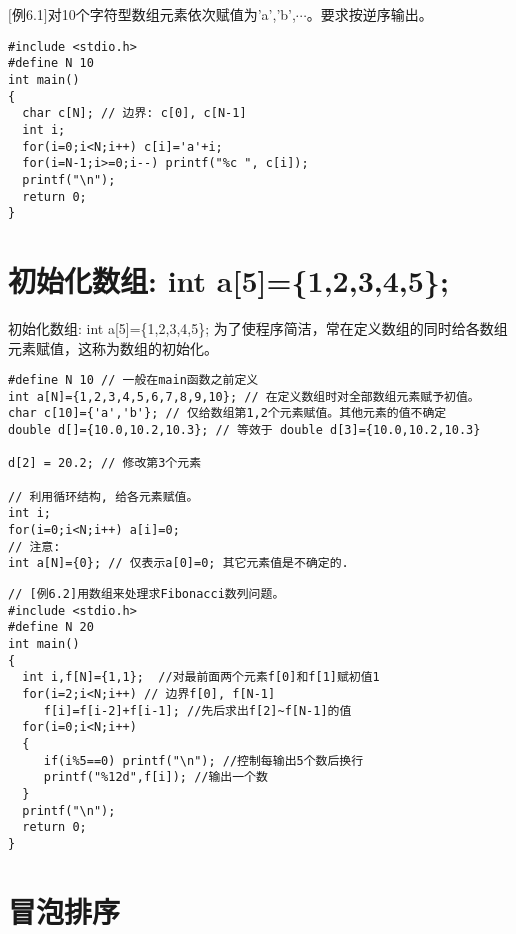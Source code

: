 \begin{frame}
$[$例6.1$]$对10个字符型数组元素依次赋值为'a','b',$\cdots$。要求按逆序输出。
\pause
\begin{lstlisting}
#include <stdio.h>
#define N 10
int main()
{
  char c[N]; // 边界: c[0], c[N-1]
  int i;
  for(i=0;i<N;i++) c[i]='a'+i; 
  for(i=N-1;i>=0;i--) printf("%c ", c[i]);
  printf("\n");
  return 0;
}
\end{lstlisting}
\end{frame}

\section{初始化数组: int a[5]=\{1,2,3,4,5\};}

\begin{frame}{初始化数组: int a[5]=\{1,2,3,4,5\};}
为了使程序简洁，常在定义数组的同时给各数组元素赋值，这称为数组的初始化。
\begin{lstlisting}
#define N 10 // 一般在main函数之前定义
int a[N]={1,2,3,4,5,6,7,8,9,10}; // 在定义数组时对全部数组元素赋予初值。
char c[10]={'a','b'}; // 仅给数组第1,2个元素赋值。其他元素的值不确定
double d[]={10.0,10.2,10.3}; // 等效于 double d[3]={10.0,10.2,10.3}

d[2] = 20.2; // 修改第3个元素

// 利用循环结构, 给各元素赋值。
int i;
for(i=0;i<N;i++) a[i]=0;
// 注意:
int a[N]={0}; // 仅表示a[0]=0; 其它元素值是不确定的.
\end{lstlisting}
\end{frame}

\begin{frame}
\vspace{-0.3cm}
\begin{lstlisting}
// [例6.2]用数组来处理求Fibonacci数列问题。
#include <stdio.h>
#define N 20
int main()
{
  int i,f[N]={1,1};  //对最前面两个元素f[0]和f[1]赋初值1
  for(i=2;i<N;i++) // 边界f[0], f[N-1]
     f[i]=f[i-2]+f[i-1]; //先后求出f[2]~f[N-1]的值
  for(i=0;i<N;i++)
  {
     if(i%5==0) printf("\n"); //控制每输出5个数后换行
     printf("%12d",f[i]); //输出一个数
  }
  printf("\n");
  return 0;
}
\end{lstlisting}
\end{frame}

\section{冒泡排序}

